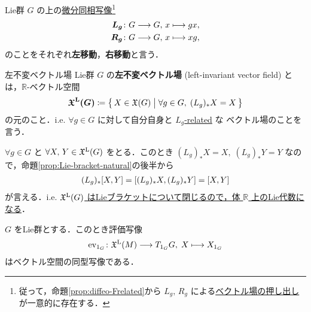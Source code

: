 \documentclass[TQFT_main]{subfiles}
\begin{document}
Lie群 $G$ の上の\underline{微分同相写像}\footnote{従って，命題\ref{prop:diffeo-Frelated}から $L_g,\, R_g$ による\hyperref[prop:diffeo-Frelated]{ベクトル場の押し出し}が一意的に存在する．}
\begin{align}
    \bm{L_g} \colon G &\longrightarrow G,\, x \longmapsto gx, \\
    \bm{R_g} \colon G &\longrightarrow G,\, x \longmapsto xg, \\
\end{align}
のことをそれぞれ\textbf{左移動}，\textbf{右移動}と言う．

\begin{mydef}[label=def:left-invariant]{左不変ベクトル場}
    Lie群 $G$ の\textbf{左不変ベクトル場} (left-invariant vector field) とは，$\mathbb{R}$-ベクトル空間
    \begin{align}
        \bm{\mathfrak{X}^{\mathrm{L}} (G)} \coloneqq \bigl\{\, X \in \mathfrak{X}(G) \bigm| \forall g \in G,\; (L_g)_* X = X \,\bigr\} 
    \end{align}
    の元のこと．i.e. $\forall g \in G$ に対して自分自身と \hyperref[def:F-related]{$L_g$-related} な \cinfty ベクトル場のことを言う．
\end{mydef}

$\forall g \in G$ と $\forall X,\, Y \in \mathfrak{X}^{\mathrm{L}}(G)$ をとる．このとき $(L_g)_* X = X,\; (L_g)_* Y = Y$ なので，命題\ref{prop:Lie-bracket-natural}の後半から
\begin{align}
    (L_g)_* \comm{X}{Y} = \comm{(L_g)_* X}{(L_g)_* Y} = \comm{X}{Y}
\end{align}
が言える．i.e. 
\underline{$\mathfrak{X}^{\mathrm{L}} (G)$ は\hyperref[def:Lie-bracket]{Lieブラケット}について閉じるので，体 $\mathbb{R}$ 上のLie代数になる}．

\begin{myprop}[label=prop:LieAlg]{}
    $G$ をLie群とする．このとき評価写像
    \begin{align}
        \mathrm{ev}_{1_G} \colon \mathfrak{X}^{\mathrm{L}}(M) \longrightarrow T_{1_G} G,\; X \longmapsto X_{1_G}
    \end{align}
    はベクトル空間の同型写像である．
\end{myprop}
\end{document}

